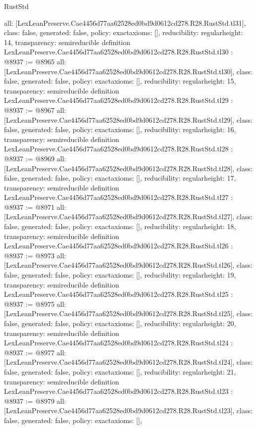 \begin{lexlean}{RustStd}
\begin{coremodule}
{  all: [LexLeanPreserve.Cae4456d77aa62528ed0bd9d0612cd278.R28.RustStd.tl31],
  class: false,
  generated: false,
  policy: exact{axioms: []},
  reducibility: regular{height: 14},
  transparency: semireducible
}
definition LexLeanPreserve.Cae4456d77aa62528ed0bd9d0612cd278.R28.RustStd.tl30 : @8937 := @8965 {
  all: [LexLeanPreserve.Cae4456d77aa62528ed0bd9d0612cd278.R28.RustStd.tl30],
  class: false,
  generated: false,
  policy: exact{axioms: []},
  reducibility: regular{height: 15},
  transparency: semireducible
}
definition LexLeanPreserve.Cae4456d77aa62528ed0bd9d0612cd278.R28.RustStd.tl29 : @8937 := @8967 {
  all: [LexLeanPreserve.Cae4456d77aa62528ed0bd9d0612cd278.R28.RustStd.tl29],
  class: false,
  generated: false,
  policy: exact{axioms: []},
  reducibility: regular{height: 16},
  transparency: semireducible
}
definition LexLeanPreserve.Cae4456d77aa62528ed0bd9d0612cd278.R28.RustStd.tl28 : @8937 := @8969 {
  all: [LexLeanPreserve.Cae4456d77aa62528ed0bd9d0612cd278.R28.RustStd.tl28],
  class: false,
  generated: false,
  policy: exact{axioms: []},
  reducibility: regular{height: 17},
  transparency: semireducible
}
definition LexLeanPreserve.Cae4456d77aa62528ed0bd9d0612cd278.R28.RustStd.tl27 : @8937 := @8971 {
  all: [LexLeanPreserve.Cae4456d77aa62528ed0bd9d0612cd278.R28.RustStd.tl27],
  class: false,
  generated: false,
  policy: exact{axioms: []},
  reducibility: regular{height: 18},
  transparency: semireducible
}
definition LexLeanPreserve.Cae4456d77aa62528ed0bd9d0612cd278.R28.RustStd.tl26 : @8937 := @8973 {
  all: [LexLeanPreserve.Cae4456d77aa62528ed0bd9d0612cd278.R28.RustStd.tl26],
  class: false,
  generated: false,
  policy: exact{axioms: []},
  reducibility: regular{height: 19},
  transparency: semireducible
}
definition LexLeanPreserve.Cae4456d77aa62528ed0bd9d0612cd278.R28.RustStd.tl25 : @8937 := @8975 {
  all: [LexLeanPreserve.Cae4456d77aa62528ed0bd9d0612cd278.R28.RustStd.tl25],
  class: false,
  generated: false,
  policy: exact{axioms: []},
  reducibility: regular{height: 20},
  transparency: semireducible
}
definition LexLeanPreserve.Cae4456d77aa62528ed0bd9d0612cd278.R28.RustStd.tl24 : @8937 := @8977 {
  all: [LexLeanPreserve.Cae4456d77aa62528ed0bd9d0612cd278.R28.RustStd.tl24],
  class: false,
  generated: false,
  policy: exact{axioms: []},
  reducibility: regular{height: 21},
  transparency: semireducible
}
definition LexLeanPreserve.Cae4456d77aa62528ed0bd9d0612cd278.R28.RustStd.tl23 : @8937 := @8979 {
  all: [LexLeanPreserve.Cae4456d77aa62528ed0bd9d0612cd278.R28.RustStd.tl23],
  class: false,
  generated: false,
  policy: exact{axioms: []},
}
\end{coremodule}
\end{lexlean}
